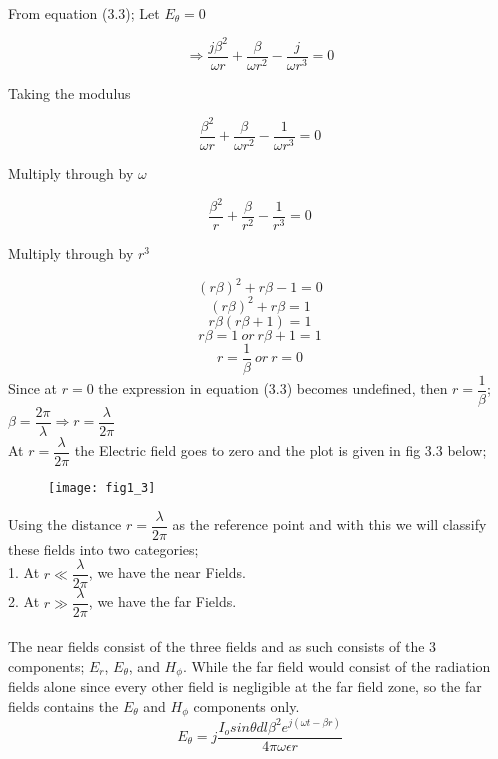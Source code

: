 	\paragraph*{} From equation (3.3); Let $E_{\theta} = 0$
	
	$$\Longrightarrow  \dfrac{j\beta^2}{\omega r} + \dfrac{\beta}{\omega r^2} - \dfrac{j}{\omega r^3} = 0 $$
	\begin{center}
		Taking the modulus
	\end{center} 
	$$  \dfrac{\beta^2}{\omega r} + \dfrac{\beta}{\omega r^2} - \dfrac{1}{\omega r^3} = 0 $$
	\begin{center}
		Multiply through by $\omega$
	\end{center}
	$$  \dfrac{\beta^2}{r} + \dfrac{\beta}{r^2} - \dfrac{1}{r^3} = 0 $$
	\begin{center}
		Multiply through by $r^3$
	\end{center} 
	$$  (r\beta)^2 + r\beta - 1 = 0 $$
	$$  (r\beta)^2 + r\beta = 1 $$
	$$  r\beta(r\beta + 1) = 1 $$
	$$ r\beta = 1 \ or \ r\beta + 1 = 1 $$
	$$ r = \dfrac{1}{\beta} \ or \ r = 0 $$
	Since at $ r = 0$ the expression in equation (3.3) becomes undefined, then $ r = \dfrac{1}{\beta} $; $\beta = \dfrac{2\pi}{\lambda} \Longrightarrow r =  \dfrac{\lambda}{2 \pi} $ \\ 
	At $ r =  \dfrac{\lambda}{2 \pi} $ the Electric field goes to zero and the plot is given in fig 3.3 below;
	\begin{figure}[h]
		\texttt{[image: fig1\_3]}
		\vspace{-20pt}
		\centering
		\caption{}
		\label{fig:1}
	\end{figure}
	Using the distance $r =  \dfrac{\lambda}{2 \pi}$ as the reference point and with this we will classify these fields into two categories; \\
	1. At $r \ll  \dfrac{\lambda}{2 \pi}$, we have the near Fields.\\
	2. At $r \gg  \dfrac{\lambda}{2 \pi}$, we have the far Fields. \\ \\
	The near fields consist of the three fields and as such consists of the $3$ components; $E_r$, $E_{\theta}$, and $H_{\phi}$. While the far field would consist of the radiation fields alone since every other field is negligible at the far field zone, so the far fields contains the $E_\theta$ and $H_\phi$ components only. 
	$$E_{\theta} = j\dfrac{I_osin \theta dl\beta^2 e^{j(\omega t - \beta r)}}{4\pi \omega \epsilon r}$$
	
